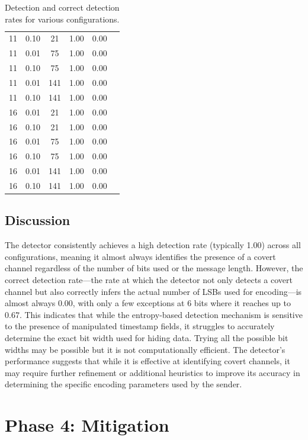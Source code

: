 \documentclass[10pt,a4paper]{article}
\begin{document}
\begin{table}[H]
\begin{tabular}{cccccc}
11 & 0.10 & 21  & 1.00 & 0.00 \\
11 & 0.01 & 75  & 1.00 & 0.00 \\
11 & 0.10 & 75  & 1.00 & 0.00 \\
11 & 0.01 & 141 & 1.00 & 0.00 \\
11 & 0.10 & 141 & 1.00 & 0.00 \\
16 & 0.01 & 21  & 1.00 & 0.00 \\
16 & 0.10 & 21  & 1.00 & 0.00 \\
16 & 0.01 & 75  & 1.00 & 0.00 \\
16 & 0.10 & 75  & 1.00 & 0.00 \\
16 & 0.01 & 141 & 1.00 & 0.00 \\
16 & 0.10 & 141 & 1.00 & 0.00 \\
\bottomrule
\end{tabular}
\caption{Detection and correct detection rates for various configurations.}
\end{table}


\subsection*{Discussion}
The detector consistently achieves a high detection rate (typically 1.00) across all configurations, meaning it almost always identifies the presence of a covert channel regardless of the number of bits used or the message length. 
However, the correct detection rate—the rate at which the detector not only detects a covert channel but also correctly infers the actual number of LSBs used for encoding—is almost always 0.00, with only a few exceptions at 6 bits where it reaches up to 0.67. 
This indicates that while the entropy-based detection mechanism is sensitive to the presence of manipulated timestamp fields, it struggles to accurately determine the exact bit width used for hiding data. 
Trying all the possible bit widths may be possible but it is not computationally efficient.
The detector's performance suggests that while it is effective at identifying covert channels, it may require further refinement or additional heuristics to improve its accuracy in determining the specific encoding parameters used by the sender.

\section*{Phase 4: Mitigation}
\end{document}
